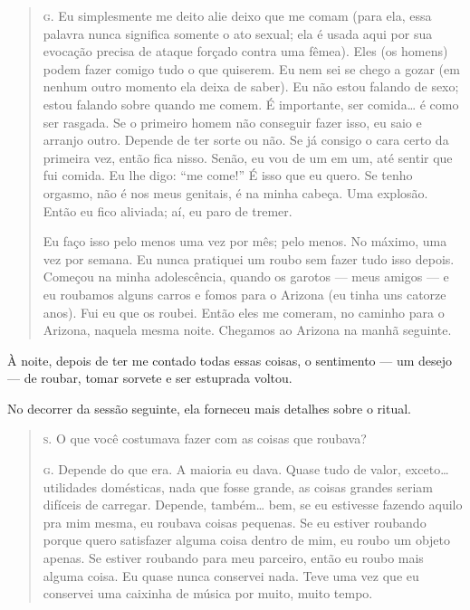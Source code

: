 \bigskip

\begin{quote}

\noindent\hskip0mm\textsc{g.} Eu simplesmente me deito ali\idxestup[|(] e deixo que me comam (para ela, essa
palavra nunca significa somente o ato sexual; ela é usada aqui por sua
evocação precisa de ataque forçado contra uma fêmea). Eles (os homens)
podem fazer comigo tudo o que quiserem. Eu nem sei se chego a gozar (em
nenhum outro momento ela deixa de saber). Eu não estou falando de sexo;
estou falando sobre quando me comem. É importante, ser comida\ldots{} é como
ser rasgada. Se o primeiro homem não conseguir fazer isso, eu saio e
arranjo outro. Depende de ter sorte ou não. Se já consigo o cara certo
da primeira vez, então fica nisso. Senão, eu vou de um em um, até
sentir que fui comida. Eu lhe digo: ``me
come!'' É isso que eu quero. Se tenho orgasmo, não é nos
meus genitais, é na minha cabeça. Uma explosão. Então eu fico aliviada;
aí, eu paro de tremer.

Eu faço isso pelo menos uma vez por mês; pelo menos. No máximo,
uma vez por semana. Eu nunca pratiquei um roubo sem fazer tudo isso
depois. Começou na minha adolescência, quando os garotos --- meus
amigos --- e eu roubamos alguns carros e fomos para o Arizona (eu
tinha uns catorze anos). Fui eu que os roubei. Então eles me comeram,
no caminho para o Arizona, naquela mesma noite. Chegamos ao Arizona na
manhã seguinte.

\end{quote}

\bigskip

À noite, depois de ter me contado todas essas coisas, o sentimento ---
um desejo --- de roubar, tomar sorvete e ser estuprada voltou.\idxestup[|)]

No decorrer da sessão seguinte, ela forneceu mais detalhes sobre o
ritual.

\bigskip

\begin{quote}

\noindent\hskip0mm\textsc{s.} O que você costumava fazer com as coisas que roubava?

\noindent\hskip0mm\textsc{g.} Depende do que era. A maioria eu dava. Quase tudo de valor, exceto\ldots{}
utilidades domésticas, nada que fosse grande, as coisas grandes seriam
difíceis de carregar. Depende, também\ldots{} bem, se eu estivesse fazendo
aquilo pra mim mesma, eu roubava coisas pequenas. Se eu estiver
roubando porque quero satisfazer alguma coisa dentro de mim, eu roubo
um objeto apenas. Se estiver roubando para meu parceiro, então eu roubo
mais alguma coisa. Eu quase nunca conservei nada. Teve uma vez que eu
conservei uma caixinha de música por muito, muito tempo.

\end{quote}

